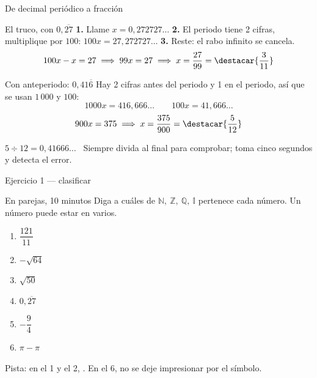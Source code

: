 \documentclass[aspectratio=169,10pt]{beamer}
\begin{document}
\begin{frame}{De decimal periódico a fracción}
  \scriptsize
  \begin{exampleblock}{El truco, con $0{,}\overline{27}$}
    \tiny
    \textbf{1.} Llame $x=0{,}272727\dots$ \quad
    \textbf{2.} El periodo tiene 2 cifras, multiplique por $100$:
    $100x = 27{,}272727\dots$ \quad
    \textbf{3.} Reste: el rabo infinito se cancela.
    \[ 100x - x = 27 \;\Longrightarrow\; 99x = 27
       \;\Longrightarrow\; x = \frac{27}{99} = \destacar{\frac{3}{11}} \]
  \end{exampleblock}

  \vspace{0.08cm}
  \begin{block}{Con anteperiodo: $0{,}41\overline{6}$}
    \tiny
    Hay 2 cifras antes del periodo y 1 en el periodo, así que se usan
    $1\,000$ y $100$:
    \[ 1000x = 416{,}666\dots \qquad 100x = 41{,}666\dots \]
    \[ 900x = 375 \;\Longrightarrow\;
       x = \frac{375}{900} = \destacar{\frac{5}{12}} \]
  \end{block}

  \vspace{0.06cm}
  {\tiny\color{uniGris}  $5\div 12 = 0{,}41666\dots$
  \checkmark \ Siempre divida al final para comprobar; toma cinco segundos y
  detecta el error.}
\end{frame}

\begin{frame}{Ejercicio 1 — clasificar}
  \begin{alertblock}{En parejas, 10 minutos}
    \scriptsize
    Diga a cuáles de $\mathbb{N},\ \mathbb{Z},\ \mathbb{Q},\ \mathbb{I}$
    pertenece cada número. Un número puede estar en varios.
    \begin{enumerate}\setlength{\itemsep}{-0.02cm}
      \item $\dfrac{121}{11}$
      \item $-\sqrt{64}$
      \item $\sqrt{50}$
      \item $0{,}\overline{27}$
      \item $-\dfrac{9}{4}$
      \item $\pi - \pi$
    \end{enumerate}
  \end{alertblock}

  \vspace{0.04cm}
  {\tiny\color{uniGris} Pista: en el 1 y el 2, . En el 6,
  no se deje impresionar por el símbolo.}
\end{frame}
\end{document}
